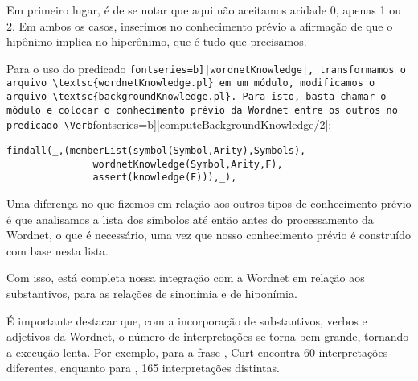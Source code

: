 	Em primeiro lugar, é de se notar que aqui não aceitamos aridade 0, apenas 1 ou 2. Em ambos os casos, inserimos no conhecimento prévio a afirmação de que o hipônimo implica no hiperônimo, que é tudo que precisamos.
	

	Para o uso do predicado \Verb[fontseries=b]|wordnetKnowledge|, transformamos o arquivo \textsc{wordnetKnowledge.pl} em um módulo, modificamos o arquivo \textsc{backgroundKnowledge.pl}. Para isto, basta chamar o módulo e colocar o conhecimento prévio da Wordnet entre os outros no predicado \Verb[fontseries=b]|computeBackgroundKnowledge/2|:
	
	\begin{Verbatim}[fontseries=b, gobble=1]
	findall(_,(memberList(symbol(Symbol,Arity),Symbols),
	           wordnetKnowledge(Symbol,Arity,F),
	           assert(knowledge(F))),_),
	\end{Verbatim}
	
	Uma diferença no que fizemos em relação aos outros tipos de conhecimento prévio é que analisamos a lista dos símbolos até então antes do processamento da Wordnet, o que é necessário, uma vez que nosso conhecimento prévio é construído com base nesta lista.
	
	Com isso, está completa nossa integração com a Wordnet em relação aos substantivos, para as relações de sinonímia e de hiponímia.

	É importante destacar que, com a incorporação de substantivos, verbos e adjetivos da Wordnet, o número de interpretações se torna bem grande, tornando a execução lenta. Por exemplo, para a frase , Curt encontra 60 interpretações diferentes, enquanto para , 165 interpretações distintas.
